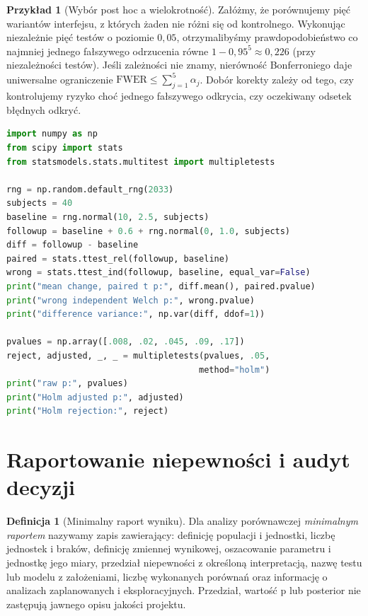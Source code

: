 \documentclass[11pt,a4paper,oneside]{report}
\numberwithin{equation}{chapter}
\theoremstyle{plain}
\theoremstyle{definition}
\newtheorem{definicja}{Definicja}[chapter]
\newtheorem{przyklad}{Przykład}[chapter]
\theoremstyle{remark}
\begin{document}
\begin{przyklad}[Wybór post hoc a wielokrotność]
Załóżmy, że porównujemy pięć wariantów interfejsu, z których żaden nie różni się od kontrolnego. Wykonując niezależnie pięć testów o poziomie $0{,}05$, otrzymalibyśmy prawdopodobieństwo co najmniej jednego fałszywego odrzucenia równe $1-0{,}95^5\approx0{,}226$ (przy niezależności testów). Jeśli zależności nie znamy, nierówność Bonferroniego daje uniwersalne ograniczenie $\mathrm{FWER}\le\sum_{j=1}^5\alpha_j$. Dobór korekty zależy od tego, czy kontrolujemy ryzyko choć jednego fałszywego odkrycia, czy oczekiwany odsetek błędnych odkryć.
\end{przyklad}

\begin{lstlisting}[language=Python,caption={Kompletny program: dane sparowane, poprawny test różnic i ilustracja wielokrotności (Python, NumPy, SciPy, statsmodels).}]
import numpy as np
from scipy import stats
from statsmodels.stats.multitest import multipletests

rng = np.random.default_rng(2033)
subjects = 40
baseline = rng.normal(10, 2.5, subjects)
followup = baseline + 0.6 + rng.normal(0, 1.0, subjects)
diff = followup - baseline
paired = stats.ttest_rel(followup, baseline)
wrong = stats.ttest_ind(followup, baseline, equal_var=False)
print("mean change, paired t p:", diff.mean(), paired.pvalue)
print("wrong independent Welch p:", wrong.pvalue)
print("difference variance:", np.var(diff, ddof=1))

pvalues = np.array([.008, .02, .045, .09, .17])
reject, adjusted, _, _ = multipletests(pvalues, .05,
                                      method="holm")
print("raw p:", pvalues)
print("Holm adjusted p:", adjusted)
print("Holm rejection:", reject)
\end{lstlisting}

\section{Raportowanie niepewności i audyt decyzji}
\begin{definicja}[Minimalny raport wyniku]
Dla analizy porównawczej \emph{minimalnym raportem} nazywamy zapis zawierający: definicję populacji i jednostki, liczbę jednostek i braków, definicję zmiennej wynikowej, oszacowanie parametru i jednostkę jego miary, przedział niepewności z określoną interpretacją, nazwę testu lub modelu z założeniami, liczbę wykonanych porównań oraz informację o analizach zaplanowanych i eksploracyjnych. Przedział, wartość p lub posterior nie zastępują jawnego opisu jakości projektu.
\end{definicja}
\end{document}

